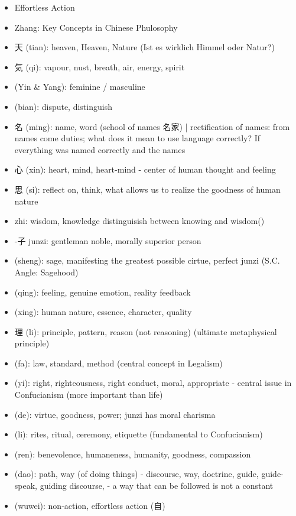 \documentclass[emulatestandardclasses]{scrartcl}
\begin{document}
\begin{itemize}
  \item Effortless Action
  \item Zhang:  Key Concepts in Chinese Phulosophy
  \item 天 (tian): heaven, Heaven, Nature (Ist es wirklich Himmel oder Natur?)
  \item 気 (qi): vapour, nust, breath, air, energy, spirit
  \item %
(Yin \& Yang): feminine / masculine
  \item %
(bian): dispute, distinguish
  \item 名 (ming): name, word (school of names 名家) | rectification of names: from names come duties; what does it mean to use language correctly? If everything was named correctly and the names
  \item 心 (xin): heart, mind, heart-mind - center of human thought and feeling
  \item 思 (si): reflect on, think, what allows us to realize the goodness of human nature
  \item zhi: wisdom, knowledge distinguisish between knowing and wisdom()
  \item -子 junzi: gentleman noble, morally superior person
  \item (sheng): sage, manifesting the greatest possible cirtue, perfect junzi (S.C. Angle: Sagehood)
  \item (qing): feeling, genuine emotion, reality feedback
  \item (xing): human nature, essence, character, quality
  \item 理 (li): principle, pattern, reason (not reasoning) (ultimate metaphysical principle)
  \item (fa): law, standard, method (central concept in Legalism)
  \item (yi): right, righteousness, right conduct, moral, appropriate - central issue in Confucianism (more important than life)
  \item (de): virtue, goodness, power; junzi has moral charisma
  \item (li): rites, ritual, ceremony, etiquette (fundamental to Confucianism)
  \item (ren): benevolence, humaneness, humanity, goodness, compassion
  \item (dao): path, way (of doing things) - discourse, way, doctrine, guide, guide-speak, guiding discourse, - a way that can be followed is not a constant 
  \item (wuwei): non-action, effortless action (自)
\end{itemize}
\end{document}
